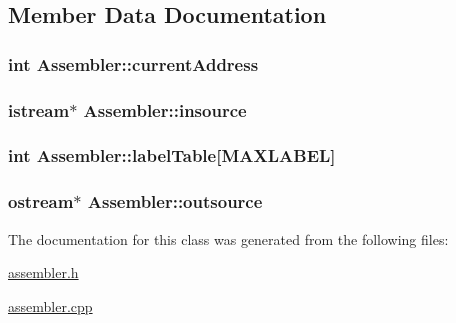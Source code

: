 \subsection{Member Data Documentation}
\hypertarget{classAssembler_a645f96a3abf12b17bdbbd3b9a20063f5}{
\subsubsection[{currentAddress}]{\setlength{\rightskip}{0pt plus 5cm}int {\bf Assembler::currentAddress}}}
\label{classAssembler_a645f96a3abf12b17bdbbd3b9a20063f5}
\hypertarget{classAssembler_a1b03f0d4cb3021f7415cb7cd0c20d4fe}{
\subsubsection[{insource}]{\setlength{\rightskip}{0pt plus 5cm}istream$\ast$ {\bf Assembler::insource}}}
\label{classAssembler_a1b03f0d4cb3021f7415cb7cd0c20d4fe}
\hypertarget{classAssembler_ad5862739b31da3c3f85afa2dc9b17fe0}{
\subsubsection[{labelTable}]{\setlength{\rightskip}{0pt plus 5cm}int {\bf Assembler::labelTable}\mbox{[}{\bf MAXLABEL}\mbox{]}}}
\label{classAssembler_ad5862739b31da3c3f85afa2dc9b17fe0}
\hypertarget{classAssembler_a5fc343ff2abfae56309dcd696d9e5295}{
\subsubsection[{outsource}]{\setlength{\rightskip}{0pt plus 5cm}ostream$\ast$ {\bf Assembler::outsource}}}
\label{classAssembler_a5fc343ff2abfae56309dcd696d9e5295}


The documentation for this class was generated from the following files:\begin{DoxyCompactItemize}
\item 
\hyperlink{assembler_8h}{assembler.h}\item 
\hyperlink{assembler_8cpp}{assembler.cpp}\end{DoxyCompactItemize}
